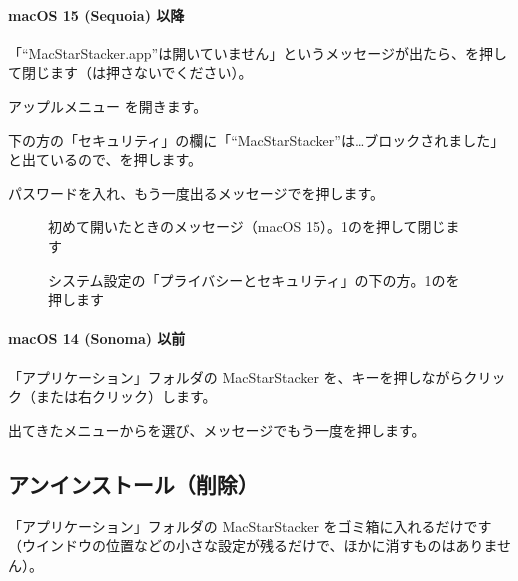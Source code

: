 \paragraph{macOS 15 (Sequoia) 以降}
\begin{steps}
  \item 「“MacStarStacker.app”は開いていません」というメッセージが出たら、を押して閉じます（は押さないでください）。
  \item アップルメニュー を開きます。
  \item 下の方の「セキュリティ」の欄に「“MacStarStacker”は…ブロックされました」と出ているので、を押します。
  \item パスワードを入れ、もう一度出るメッセージでを押します。
\end{steps}

\begin{figure}[H]
\centering
{}
\caption{初めて開いたときのメッセージ（macOS 15）。\num{1}のを押して閉じます}
\end{figure}

\begin{figure}[H]
\centering
{}
\caption{システム設定の「プライバシーとセキュリティ」の下の方。\num{1}のを押します}
\end{figure}

\paragraph{macOS 14 (Sonoma) 以前}
\begin{steps}
  \item 「アプリケーション」フォルダの MacStarStacker を、キーを押しながらクリック（または右クリック）します。
  \item 出てきたメニューからを選び、メッセージでもう一度を押します。
\end{steps}

\subsection{アンインストール（削除）}

「アプリケーション」フォルダの MacStarStacker をゴミ箱に入れるだけです（ウインドウの位置などの小さな設定が残るだけで、ほかに消すものはありません）。
